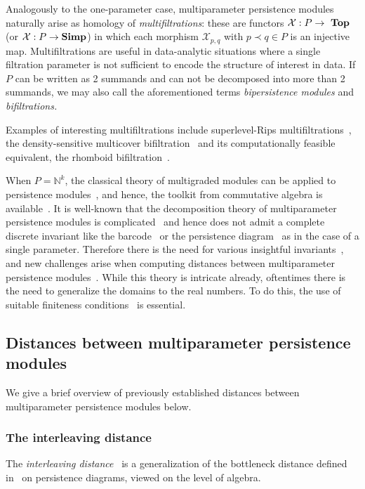 \documentclass[sigconf, nonacm, natbib=false]{acmart} %
\def\X {{\mathcal{X}}}
\def\NN{{\mathbb{N}}}
\def\top{\bf~Top}
\def\simp{\bf Simp}
\theoremstyle{plain}
\begin{document}
Analogously to the one-parameter case, multiparameter persistence modules naturally arise as homology of \emph{multifiltrations}: 
these are functors $\X:P\rightarrow\top$ (or $\X:P\rightarrow\simp$) in which each morphism $\X_{p,q}$ with $p \prec q \in P$ is an injective map. 
Multifiltrations are useful in data-analytic situations where a single filtration parameter is not sufficient to encode the structure of interest in data.
If $P$ can be written as 2 summands and can not be decomposed into more than 2 summands, we may also call the aforementioned terms \emph{bipersistence modules} and \emph{bifiltrations.}

Examples of interesting multifiltrations include superlevel-Rips multifiltrations~\cite{carlsson2009theory}, the density-sensitive multicover bifiltration~\cite{Chazal2011,Sheehy2012} and its computationally feasible equivalent, the rhomboid bifiltration~\cite{corbet2021computing}. 

When $P=\NN^k$, the classical theory of multigraded modules can be applied to persistence modules~\cite{carlsson2009theory}, and hence, the toolkit from commutative algebra is available~\cite{eisenbud1995commutative,miller2005combinatorial}. It is well-known that the decomposition theory of multiparameter persistence modules is complicated~\cite{gabriel1972unzerlegbare,carlsson2009theory} and hence does not admit a complete discrete invariant like the barcode~\cite{Ghrist2008} or the persistence diagram~\cite{Cohen-SteinerEdelsbrunnerHarer2007} as in the case of a single parameter. Therefore there is the need for various insightful invariants~\cite{lesnick2019computing,harrington2017stratifying,thomasdiss,scolamiero2017multidimensional,CCS21}, and new challenges arise when computing distances between multiparameter persistence modules~\cite{bjerkevik2019computing,kerber2019exact,gafvert2017stable}.
While this theory is intricate already, oftentimes there is the need to generalize the domains to the real numbers. To do this, the use of suitable finiteness conditions~\cite{CK18,Lesnick2015,miller2017data,scolamiero2017multidimensional} is essential. 

\subsection{Distances between multiparameter persistence modules}\label{sec:distances}
We give a brief overview of previously established distances between multiparameter persistence modules below.

\subsubsection{The interleaving distance}
The \emph{interleaving distance}~\cite{chazalinterleaving,lesnick2015theory} is a %
generalization of the bottleneck distance defined in~ on persistence diagrams, viewed on the level of algebra. 
\end{document}
